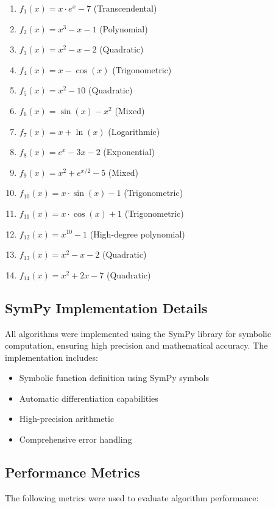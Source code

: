 \documentclass[reprint, amsmath, amssymb, aps, prl]{revtex4-2}
\begin{document}
\begin{enumerate}
    \item $f_1(x) = x \cdot e^x - 7$ (Transcendental)
    \item $f_2(x) = x^3 - x - 1$ (Polynomial)
    \item $f_3(x) = x^2 - x - 2$ (Quadratic)
    \item $f_4(x) = x - \cos(x)$ (Trigonometric)
    \item $f_5(x) = x^2 - 10$ (Quadratic)
    \item $f_6(x) = \sin(x) - x^2$ (Mixed)
    \item $f_7(x) = x + \ln(x)$ (Logarithmic)
    \item $f_8(x) = e^x - 3x - 2$ (Exponential)
    \item $f_9(x) = x^2 + e^{x/2} - 5$ (Mixed)
    \item $f_{10}(x) = x \cdot \sin(x) - 1$ (Trigonometric)
    \item $f_{11}(x) = x \cdot \cos(x) + 1$ (Trigonometric)
    \item $f_{12}(x) = x^{10} - 1$ (High-degree polynomial)
    \item $f_{13}(x) = x^2 - x - 2$ (Quadratic)
    \item $f_{14}(x) = x^2 + 2x - 7$ (Quadratic)
\end{enumerate}

\subsection{SymPy Implementation Details}

All algorithms were implemented using the SymPy library for symbolic computation, ensuring high precision and mathematical accuracy. The implementation includes:

\begin{itemize}
    \item Symbolic function definition using SymPy symbols
    \item Automatic differentiation capabilities
    \item High-precision arithmetic
    \item Comprehensive error handling
\end{itemize}

\subsection{Performance Metrics}

The following metrics were used to evaluate algorithm performance:
\end{document}
